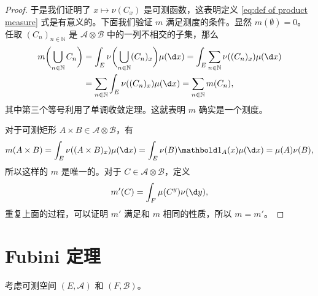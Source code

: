 \documentclass[fontset=none]{Notes}
\newcommand{\indicator}[1]{\mathbold 1_{#1}}
\begin{document}
\begin{proof}
  于是我们证明了 $x\mapsto \nu(C_x)$ 是可测函数，这表明定义 \eqref{eq:def of product measure}
  式是有意义的。下面我们验证 $m$ 满足测度的条件。显然 $m(\emptyset)=0$。
  任取 $(C_n)_{n\in \mathbb{N}}$ 是 $\mathcal{A}\otimes \mathcal{B}$
  中的一列不相交的子集，那么
  \begin{align*}
    m\biggl(\bigcup_{n\in \mathbb{N}}C_n\biggr)&=\int_E
    \nu\biggl(\bigcup_{n\in \mathbb{N}}(C_n)_x\biggr)\mu(\d x)
    =\int_E\sum_{n\in \mathbb{N}}\nu((C_n)_x)\mu(\d x)\\
    &=\sum_{n\in \mathbb{N}}\int_E\nu((C_n)_x)\mu(\d x)
    =\sum_{n\in \mathbb{N}}m(C_n),
  \end{align*}
  其中第三个等号利用了单调收敛定理。这就表明 $m$ 确实是一个测度。

  对于可测矩形 $A\times B\in \mathcal{A}\otimes \mathcal{B}$，有
  \[
    m(A\times B)=\int_E\nu((A\times B)_x)\mu(\d x)
    =\int_E\nu(B)\indicator{A}(x)\mu(\d x)  
    =\mu(A)\nu(B),
  \]
  所以这样的 $m$ 是唯一的。对于 $C\in \mathcal{A}\otimes \mathcal{B}$，定义
  \begin{equation*}
    m'(C) =\int_F\mu(C^y)\nu(\d y),
  \end{equation*}
  重复上面的过程，可以证明 $m'$ 满足和 $m$ 相同的性质，所以 $m=m'$。
\end{proof}

\section{Fubini 定理}

考虑可测空间 $(E,\mathcal{A})$ 和 $(F,\mathcal{B})$。
\end{document}
